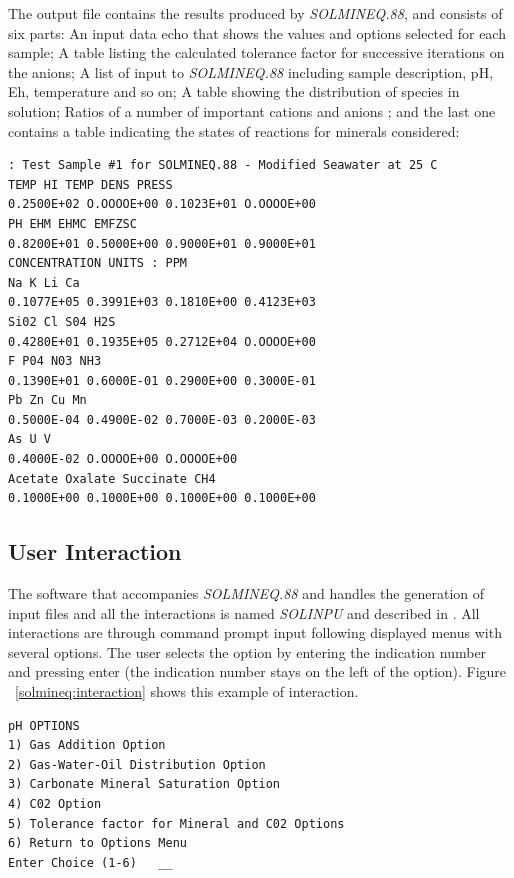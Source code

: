The output file contains the results produced by \emph{SOLMINEQ.88}, and consists of six parts: An input data echo that shows the values and options selected for each sample; A table listing the calculated tolerance factor for successive iterations on the anions; A list of input to \emph{SOLMINEQ.88} including sample description, pH, Eh, temperature and so on; A table showing the distribution of species in solution; Ratios of a number of important cations and anions ; and the last one contains a table indicating the states of reactions for minerals considered:

\begin{minipage}[c]{0.92\textwidth}
\begin{lstlisting}[frame=single, caption=\emph{SOLMINEQ.88}'s excerpt from the output file, label=solmineq:output]
 : Test Sample #1 for SOLMINEQ.88 - Modified Seawater at 25 C
TEMP HI TEMP DENS PRESS
0.2500E+02 O.OOOOE+00 0.1023E+01 O.OOOOE+00
PH EHM EHMC EMFZSC
0.8200E+01 0.5000E+00 0.9000E+01 0.9000E+01
CONCENTRATION UNITS : PPM
Na K Li Ca
0.1077E+05 0.3991E+03 0.1810E+00 0.4123E+03
Si02 Cl S04 H2S
0.4280E+01 0.1935E+05 0.2712E+04 O.OOOOE+00
F P04 N03 NH3
0.1390E+01 0.6000E-01 0.2900E+00 0.3000E-01
Pb Zn Cu Mn
0.5000E-04 0.4900E-02 0.7000E-03 0.2000E-03
As U V
0.4000E-02 O.OOOOE+00 O.OOOOE+00
Acetate Oxalate Succinate CH4
0.1000E+00 0.1000E+00 0.1000E+00 0.1000E+00
\end{lstlisting}
\end{minipage}

\subsection{User Interaction}
The software that accompanies \emph{SOLMINEQ.88} and handles the generation of input files and all the interactions is named \emph{SOLINPU} and described in \cite{Debraal:89}. All interactions are through command prompt input following displayed menus with several options. The user selects the option by entering the indication number and pressing enter (the indication number stays on the left of the option). Figure ~\ref{solmineq:interaction} shows this example of interaction.

\begin{minipage}[c]{0.92\textwidth}
\begin{lstlisting}[frame=single, caption=\emph{SOLMINEQ.88}'s example of user interaction, label=solmineq:interaction]
	pH OPTIONS
1) Gas Addition Option
2) Gas-Water-Oil Distribution Option
3) Carbonate Mineral Saturation Option
4) C02 Option
5) Tolerance factor for Mineral and C02 Options
6) Return to Options Menu
Enter Choice (1-6)   __
\end{lstlisting}
\end{minipage}

